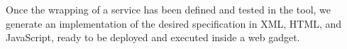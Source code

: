 


Once the wrapping of a service has been defined and tested in the tool, we generate an implementation of the desired specification in XML, HTML, and JavaScript, ready to be deployed and executed inside a web gadget. 


% 
% 
% 

